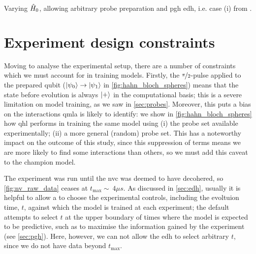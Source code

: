 Varying $\hat{H}_0$, allowing arbitrary probe preparation and \gls{pgh} \gls{edh}, 
    i.e. case (i) from \cite{gentile2020learning}. 

\section{Experiment design constraints}
Moving to analyse the experimental setup, there are a number of constraints which we must account for in 
    training models. 
Firstly, the $\nicefrac{\pi}{2}$-pulse applied to the prepared qubit ($\ket{\psi_0} \rightarrow \ket{\psi_1}$ in \cref{fig:hahn_bloch_spheres})
    means that the state before evolution is always $\ket{+}$ in the computational basis;
    this is a severe limitation on model training, as we saw in \cref{sec:probes}. 
Moreover, this puts a bias on the interactions \gls{qmla} is likely to identify:
    we show in \cref{fig:hahn_bloch_spheres} how \gls{qhl} performs in training the same model using 
    (i) the probe set available experimentally; (ii) a more general (random) probe set. 
This has a noteworthy impact on the outcome of this study, 
    since this suppression of terms means we are more likely to find some interactions
    than others, so we must add this caveat to the champion model. 
\par

The experiment was run until the \gls{nvc} was deemed to have decohered, 
    so \cref{fig:nv_raw_data} ceases at $t_{\textrm{max}} \sim \ 4 \mu s$. 
As discussed in \cref{sec:edh}, usually it is helpful to allow a  to
    choose the experimental controls, including the evoltuion time, $t$, against which 
    the model is trained at each experiment;
    the default  attempts to select $t$ at the upper boundary of times 
    where the model is expected to be predictive, such as to maximise the information gained by the experiment (see \cref{sec:pgh}). 
Here, however, we can not allow the \gls{edh} to select arbitrary $t$, 
    since we do not have data beyond $t_{\textrm{max}}$. 

\par 

